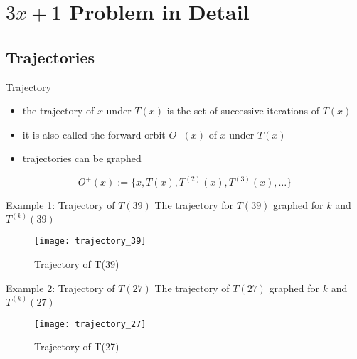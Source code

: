 \documentclass[hyperref={colorlinks,allcolors=black}]{beamer}
\begin{document}
\section[Details]{$3x+1$ Problem in Detail}

\subsection{Trajectories}


\begin{frame}{Trajectory}
\begin{itemize}
    \item the trajectory of $x$ under $T(x)$ is the set of successive
        iterations of $T(x)$ \cite{src:chamberland}
    \item it is also called the forward orbit $O^+(x)$ of $x$ under $T(x)$ 
        \cite{src:chamberland}
    \item trajectories can be graphed 
\end{itemize}
\begin{equation}
    \nonumber
    O^+(x):=\{x, T(x), T^{(2)}(x), T^{(3)}(x),\dots\}
\end{equation}
\end{frame}


\begin{frame}{Example 1: Trajectory of $T(39)$}
    The trajectory for $T(39)$ graphed for $k$ and $T^{(k)}(39)$
\begin{figure}
\texttt{[image: trajectory\_39]}
\caption{Trajectory of T(39)}
\end{figure}
\end{frame}


\begin{frame}{Example 2: Trajectory of $T(27)$}
The trajectory of $T(27)$ graphed for $k$ and $T^{(k)}(27)$
\begin{figure}
\texttt{[image: trajectory\_27]}
\caption{Trajectory of T(27)}
\end{figure}
\end{frame}

\end{document}
